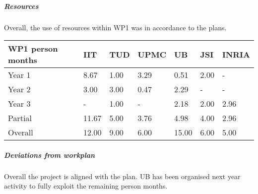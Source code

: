 

\subparagraph*{Resources}
Overall, the use of resources within WP1 was in accordance to the plans. 

\begin{center}
  \begin{tabular}{|C{1.5cm}|C{1.5cm}|C{1.5cm}|C{2cm}|C{2cm}|C{2cm}|C{2cm}|}
    \hline \footnotesize \textbf{WP1 person months}& \footnotesize
    \textbf{IIT}&\footnotesize \textbf{TUD}&\footnotesize \textbf{UPMC}&
    \footnotesize \textbf{UB} &\footnotesize \textbf{JSI} & \footnotesize \textbf{INRIA}\\
    \hline \footnotesize Year 1  & 8.67  & 1.00 & 3.29 & 0.51 & 2.00 & -\\
    \hline \footnotesize Year 2  & 3.00  & 3.00 & 0.47 & 2.29 & -    & - \\
    \hline \footnotesize Year 3  & -     & 1.00 & -    & 2.18 & 2.00 & 2.96 \\
	\hline \footnotesize Partial & 11.67 & 5.00 & 3.76 & 4.98 & 4.00 & 2.96 \\
	\hline
    \hline \footnotesize Overall & 12.00 & 9.00 & 6.00 & 15.00 & 6.00 & 5.00 \\
    \hline
  \end{tabular}
\end{center}

\subparagraph*{Deviations from workplan} 
Overall the project is aligned with the plan. UB has been organised next year activity to fully exploit the remaining person months.
